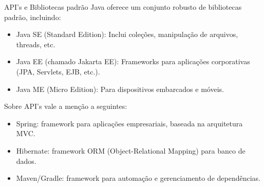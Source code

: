 \begin{frame}{API's e Bibliotecas padrão}
  Java oferece um conjunto robusto de bibliotecas padrão, incluindo:
  \begin{itemize}
    \item Java SE (Standard Edition): Inclui coleções, manipulação de arquivos, threads, etc.
    \item Java EE (chamado Jakarta EE): Frameworks para aplicações corporativas (JPA, Servlets, EJB, etc.).
    \item Java ME (Micro Edition): Para dispositivos embarcados e móveis.
  \end{itemize}
  Sobre API's vale a menção a seguintes:
  \begin{itemize}
    \item Spring: framework para aplicações empresariais, baseada na arquitetura MVC.
    \item Hibernate: framework ORM (Object-Relational Mapping) para banco de dados.
    \item Maven/Gradle: framework para automação e gerenciamento de dependências.
  \end{itemize}
\end{frame}
